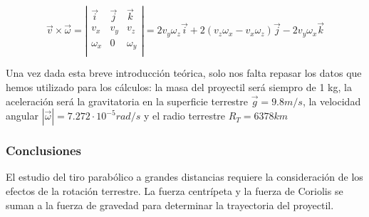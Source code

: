 \documentclass[11pt]{article}
\begin{document}
        \begin{equation}
            \vec{v}\times\vec{\omega}=
            \left|\begin{matrix}
                \vec{i}   & \vec{j} &\vec{k}\\ 
                v_{x}     & v_{y}   &v_{z}\\
                \omega_{x}& 0       &\omega_{y}\\
            \end{matrix}\right|
            =2v_{y}\omega_{z}\vec{i}+2(v_{z}\omega_{x}-v_{x}\omega_{z})\vec{j}-2v_{y}\omega_{x}\vec{k}
        \end{equation}
        
        \noindent Una vez dada esta breve introducción teórica, solo nos falta repasar los datos que hemos utilizado para los cálculos: la masa del proyectil será siempro de 1 kg, la aceleración será la gravitatoria en la superficie terrestre $\vec{g}=9.8m/s$, la velocidad angular $\left|\vec{\omega}\right|=7.272\cdot10^{-5}rad/s$ y el radio terrestre $R_{T}=6378km$
        
        \subsubsection*{Conclusiones}
        
        \noindent El estudio del tiro parabólico a grandes distancias requiere la consideración de los efectos de la rotación terrestre. La fuerza centrípeta y la fuerza de Coriolis se suman a la fuerza de gravedad para determinar la trayectoria del proyectil.\\
                
\end{document}
